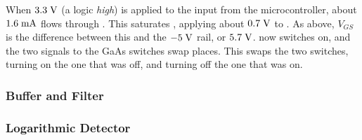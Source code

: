 When $3.3\;\mathrm{V}$ (a logic \emph{high}) is applied to the input from the
microcontroller, about $1.6\;\mathrm{mA}$ flows through . This
saturates , applying about $0.7\;\mathrm{V}$ to . As above,
$V_{GS}$ is the difference between this and the $-5\;\mathrm{V}$ rail, or
$5.7\;\mathrm{V}$.  now switches on, and the two signals to the GaAs
switches swap places. This swaps the two switches, turning on the one that was
off, and turning off the one that was on.


\subsubsection{Buffer and Filter}

\subsubsection{Logarithmic Detector}
